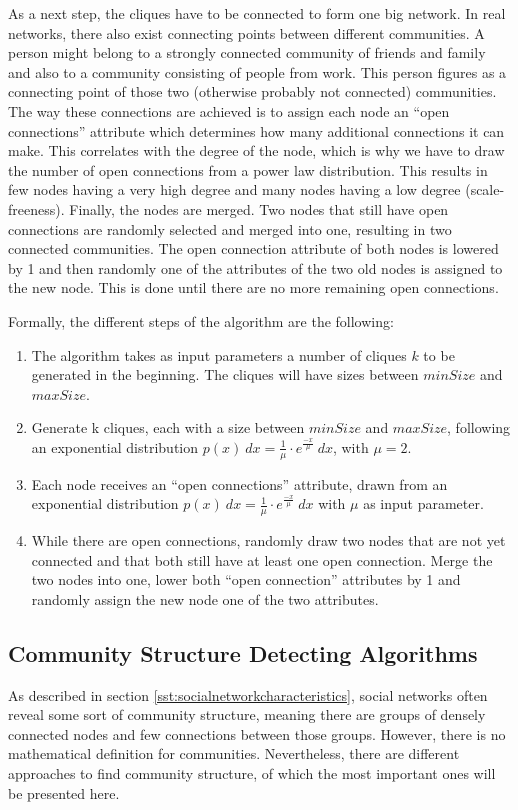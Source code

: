 As a next step, the cliques have to be connected to form one big network. In real networks, there also exist connecting points between different communities. A person might belong to a strongly connected community of friends and family and also to a community consisting of people from work. This person figures as a connecting point of those two (otherwise probably not connected) communities. The way these connections are achieved is to assign each node an ``open connections'' attribute which determines how many additional connections it can make. This correlates with the degree of the node, which is why we have to draw the number of open connections from a power law distribution. This results in few nodes having a very high degree and many nodes having a low degree (scale-freeness). Finally, the nodes are merged. Two nodes that still have open connections are randomly selected and merged into one, resulting in two connected communities. The open connection attribute of both nodes is lowered by 1 and then randomly one of the attributes of the two old nodes is assigned to the new node. This is done until there are no more remaining open connections.
\newline

Formally, the different steps of the algorithm are the following:

\begin{enumerate}
\item The algorithm takes as input parameters a number of cliques $k$ to be generated in the beginning. The cliques will have sizes between $minSize$ and $maxSize$.
\item Generate k cliques, each with a size between $minSize$ and $maxSize$, following an exponential distribution $p(x)\:dx = \frac{1}{\mu} \cdot e^{\frac{-x}{\mu}}\:dx$, with $\mu = 2$.
\item Each node receives an ``open connections'' attribute, drawn from an exponential distribution $p(x)\:dx = \frac{1}{\mu} \cdot e^{\frac{-x}{\mu}}\:dx$ with $\mu$ as input parameter.
\item While there are open connections, randomly draw two nodes that are not yet connected and that both still have at least one open connection. Merge the two nodes into one, lower both ``open connection'' attributes by 1 and randomly assign the new node one of the two attributes.
\end{enumerate}

\subsection{Community Structure Detecting Algorithms}
\label{sst:communityalgorithms} As described in section \ref{sst:socialnetworkcharacteristics}, social networks often reveal some sort of community structure, meaning there are groups of densely connected nodes and few connections between those groups. However, there is no mathematical definition for communities. Nevertheless, there are different approaches to find community structure, of which the most important ones will be presented here.

